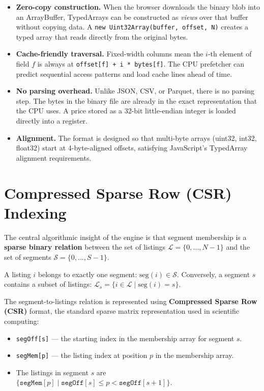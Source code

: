 \documentclass[11pt,a4paper,twoside]{book}
\begin{document}
\begin{itemize}[leftmargin=*]
    \item \textbf{Zero-copy construction.} When the browser downloads the binary blob into an
          ArrayBuffer, TypedArrays can be constructed as \textit{views} over that buffer without
          copying data. A \texttt{new Uint32Array(buffer, offset, N)} creates a typed array that
          reads directly from the original bytes.
    \item \textbf{Cache-friendly traversal.} Fixed-width columns mean the $i$-th element of field
          $f$ is always at \texttt{offset[f] + i * bytes[f]}. The CPU prefetcher can predict
          sequential access patterns and load cache lines ahead of time.
    \item \textbf{No parsing overhead.} Unlike JSON, CSV, or Parquet, there is no parsing step.
          The bytes in the binary file are already in the exact representation that the CPU uses.
          A price stored as a 32-bit little-endian integer is loaded directly into a register.
    \item \textbf{Alignment.} The format is designed so that multi-byte arrays (uint32, int32,
          float32) start at 4-byte-aligned offsets, satisfying JavaScript's TypedArray alignment
          requirements.
\end{itemize}

\section{Compressed Sparse Row (CSR) Indexing}

The central algorithmic insight of the engine is that segment membership is a \textbf{sparse
binary relation} between the set of listings $\mathcal{L} = \{0, \ldots, N-1\}$ and the set
of segments $\mathcal{S} = \{0, \ldots, S-1\}$.

A listing $i$ belongs to exactly one segment: $\text{seg}(i) \in \mathcal{S}$. Conversely,
a segment $s$ contains a subset of listings: $\mathcal{L}_s = \{i \in \mathcal{L} \mid
\text{seg}(i) = s\}$.

The segment-to-listings relation is represented using \textbf{Compressed Sparse Row (CSR)}
format, the standard sparse matrix representation used in scientific computing:

\begin{itemize}[leftmargin=*]
    \item \texttt{segOff[s]} --- the starting index in the membership array for segment $s$.
    \item \texttt{segMem[p]} --- the listing index at position $p$ in the membership array.
    \item The listings in segment $s$ are $\{\texttt{segMem}[p] \mid \texttt{segOff}[s] \leq
          p < \texttt{segOff}[s+1]\}$.
\end{itemize}
\end{document}
